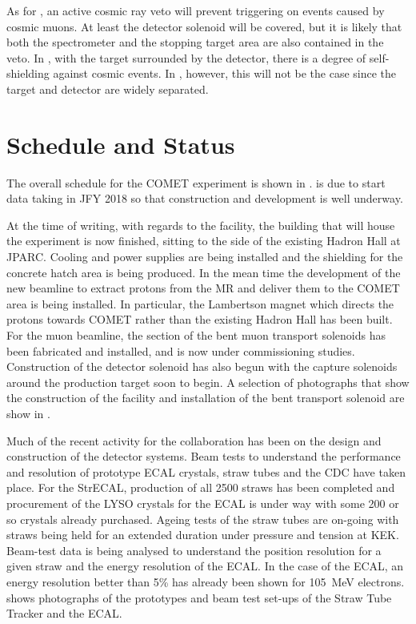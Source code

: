 As for \phaseI, an active cosmic ray veto will prevent triggering on events caused by cosmic muons.
At least the detector solenoid will be covered, but it is likely that both the spectrometer and the stopping target area are also contained in the veto.
In \phaseI, with the target surrounded by the detector, there is a degree of self-shielding against cosmic events. 
In \phaseII, however, this will not be the case since the target and detector are widely separated.


\section{Schedule and Status}
\FigSchedule
The overall schedule for the COMET experiment is shown in .
\phaseI is due to start data taking in \ac{JFY} 2018 so that construction and development is well underway.

\FigStatusFacility
At the time of writing, with regards to the facility, the building that will house the experiment is now finished, sitting to the side of the existing Hadron Hall at \ac{JPARC}.
Cooling and power supplies are being installed and the shielding for the concrete hatch area is being produced.
In the mean time the development of the new beamline to extract protons from the \ac{MR} and deliver them to the COMET area is being installed.
In particular, the Lambertson magnet which directs the protons towards COMET rather than the existing Hadron Hall has been built.
For the muon beamline, the \phaseI section of the bent muon transport solenoids has been fabricated and installed, and is now under commissioning studies.
Construction of the detector solenoid has also begun with the capture solenoids around the production target soon to begin.
A selection of photographs that show the construction of the facility and installation of the bent transport solenoid are show in .

\FigStatusStrECAL
Much of the recent activity for the collaboration has been on the design and construction of the detector systems.
Beam tests to understand the performance and resolution of prototype ECAL crystals, straw tubes and the \ac{CDC} have taken place.
For the \ac{StrECAL}, production of all 2500 \phaseI straws has been completed and procurement of the \ac{LYSO} crystals for the ECAL is under way with some 200 or so crystals already purchased.
Ageing tests of the straw tubes are on-going with straws being held for an extended duration under pressure and tension at KEK.
Beam-test data is being analysed to understand the position resolution for a given straw and the energy resolution of the ECAL.
In the case of the ECAL, an energy resolution better than 5\% has already been shown for 105~MeV electrons.
 shows photographs of the prototypes and beam test set-ups of the Straw Tube Tracker and the ECAL.

